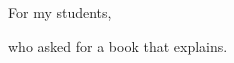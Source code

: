 \begin{dedication}
  For my students,
  \par
  who asked for a book that explains.
\end{dedication}
